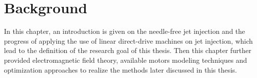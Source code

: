 \chapter{Background}                                \label{Chapter:background}

    In this chapter, an introduction is given on the needle-free jet injection and the progress of applying the use of linear direct-drive machines on jet injection, which lead to the definition of the research goal of this thesis. Then this chapter further provided electromagnetic field theory, available motors modeling techniques and optimization approaches to realize the methods later discussed in this thesis.



    
